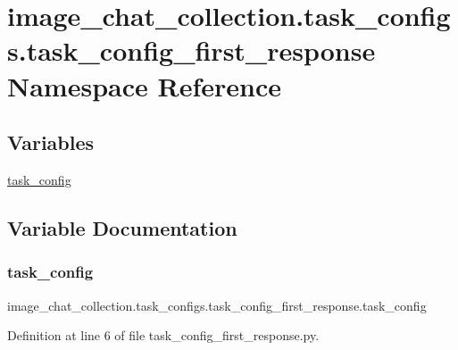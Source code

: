 \hypertarget{namespaceimage__chat__collection_1_1task__configs_1_1task__config__first__response}{}\section{image\+\_\+chat\+\_\+collection.\+task\+\_\+configs.\+task\+\_\+config\+\_\+first\+\_\+response Namespace Reference}
\label{namespaceimage__chat__collection_1_1task__configs_1_1task__config__first__response}
\subsection*{Variables}
\begin{DoxyCompactItemize}
\item 
\hyperlink{namespaceimage__chat__collection_1_1task__configs_1_1task__config__first__response_a2a7095ffbde7fcbe33f8758f018f14bf}{task\+\_\+config}
\end{DoxyCompactItemize}


\subsection{Variable Documentation}
\mbox{\label{namespaceimage__chat__collection_1_1task__configs_1_1task__config__first__response_a2a7095ffbde7fcbe33f8758f018f14bf}} 
\subsubsection{\texorpdfstring{task\+\_\+config}{task\_config}}
{\footnotesize\ttfamily image\+\_\+chat\+\_\+collection.\+task\+\_\+configs.\+task\+\_\+config\+\_\+first\+\_\+response.\+task\+\_\+config}



Definition at line 6 of file task\+\_\+config\+\_\+first\+\_\+response.\+py.

